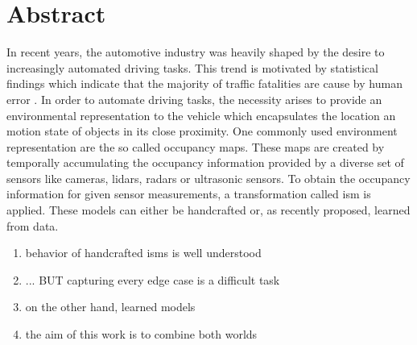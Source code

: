 \chapter{Abstract}
\label{ch:abstract}
In recent years, the automotive industry was heavily shaped by the desire to increasingly automated driving tasks. This trend is motivated by statistical findings which indicate that the majority of traffic fatalities are cause by human error \cite{world2018global}. In order to automate driving tasks, the necessity arises to provide an environmental representation to the vehicle which encapsulates the location an motion state of objects in its close proximity. One commonly used environment representation are the so called occupancy maps. These maps are created by temporally accumulating the occupancy information provided by a diverse set of sensors like cameras, lidars, radars or ultrasonic sensors. To obtain the occupancy information for given sensor measurements, a transformation called \gls{ism} is applied. These models can either be handcrafted or, as recently proposed, learned from data. 
\begin{enumerate}
	\item behavior of handcrafted \gls{ism}s is well understood
	\item ... BUT capturing every edge case is a difficult task
	\item on the other hand, learned models 
	\item the aim of this work is to combine both worlds
\end{enumerate}